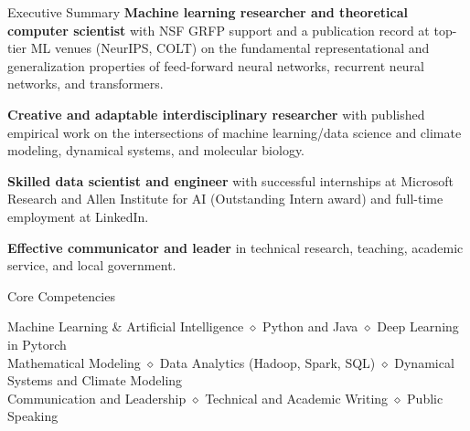 \documentclass{resume} %
\begin{document}

\begin{rSection}{Executive Summary}
\textbf{Machine learning researcher and theoretical computer scientist} with NSF GRFP support and a publication record at top-tier ML venues (NeurIPS, COLT)  on the fundamental representational and generalization properties of feed-forward neural networks, recurrent neural networks, and transformers.

\textbf{Creative and adaptable interdisciplinary researcher} with published empirical work on the intersections of machine learning/data science and climate modeling, dynamical systems, and molecular biology.

\textbf{Skilled data scientist and engineer} with successful internships at Microsoft Research and Allen Institute for AI (Outstanding Intern award) and full-time employment at LinkedIn. 

\textbf{Effective communicator and leader} in technical research, teaching, academic service, and local government.
\end{rSection}

\begin{rSection}{Core Competencies}
\begin{center}
Machine Learning \& Artificial Intelligence 	$\diamond$ Python and Java $\diamond$ 
Deep Learning in Pytorch \\ %
Mathematical Modeling $\diamond$ Data Analytics (Hadoop, Spark, SQL) $\diamond$ 
Dynamical Systems and Climate Modeling \\ %
Communication and Leadership $\diamond$ Technical and Academic Writing $\diamond$ Public Speaking
\end{center}


\end{rSection}
\end{document}
